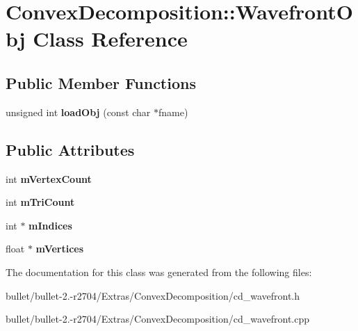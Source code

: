 \hypertarget{class_convex_decomposition_1_1_wavefront_obj}{\section{Convex\+Decomposition\+:\+:Wavefront\+Obj Class Reference}
\label{class_convex_decomposition_1_1_wavefront_obj}
}
\subsection*{Public Member Functions}
\begin{DoxyCompactItemize}
\item 
\hypertarget{class_convex_decomposition_1_1_wavefront_obj_a779953f77985678644d514f5048499ec}{unsigned int {\bfseries load\+Obj} (const char $\ast$fname)}\label{class_convex_decomposition_1_1_wavefront_obj_a779953f77985678644d514f5048499ec}

\end{DoxyCompactItemize}
\subsection*{Public Attributes}
\begin{DoxyCompactItemize}
\item 
\hypertarget{class_convex_decomposition_1_1_wavefront_obj_a00bfacdce9954a34377aa82d76f8bf55}{int {\bfseries m\+Vertex\+Count}}\label{class_convex_decomposition_1_1_wavefront_obj_a00bfacdce9954a34377aa82d76f8bf55}

\item 
\hypertarget{class_convex_decomposition_1_1_wavefront_obj_a2827474adfa954eacd1bad0e21177c87}{int {\bfseries m\+Tri\+Count}}\label{class_convex_decomposition_1_1_wavefront_obj_a2827474adfa954eacd1bad0e21177c87}

\item 
\hypertarget{class_convex_decomposition_1_1_wavefront_obj_a11122571af4fc60431aae82262e97bbd}{int $\ast$ {\bfseries m\+Indices}}\label{class_convex_decomposition_1_1_wavefront_obj_a11122571af4fc60431aae82262e97bbd}

\item 
\hypertarget{class_convex_decomposition_1_1_wavefront_obj_a86f69f6f01eda63bde0807c2982564d9}{float $\ast$ {\bfseries m\+Vertices}}\label{class_convex_decomposition_1_1_wavefront_obj_a86f69f6f01eda63bde0807c2982564d9}

\end{DoxyCompactItemize}


The documentation for this class was generated from the following files\+:\begin{DoxyCompactItemize}
\item 
bullet/bullet-\/2.-\/r2704/\+Extras/\+Convex\+Decomposition/cd\+\_\+wavefront.\+h\item 
bullet/bullet-\/2.-\/r2704/\+Extras/\+Convex\+Decomposition/cd\+\_\+wavefront.\+cpp\end{DoxyCompactItemize}
